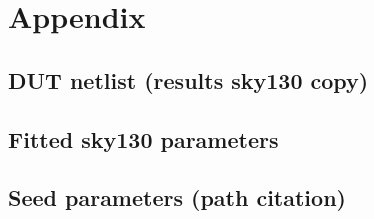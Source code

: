 \documentclass[11pt]{article}
\begin{document}
\section{Appendix}
\subsection{DUT netlist (results sky130 copy)}

\subsection{Fitted sky130 parameters}

\subsection{Seed parameters (path citation)}

\end{document}
